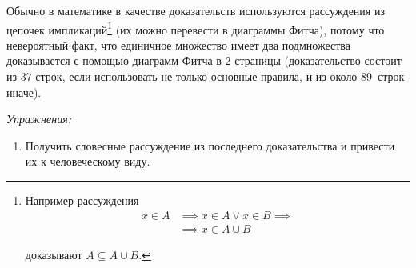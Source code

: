 Обычно в математике в качестве доказательств используются рассуждения
из цепочек импликаций\footnote{
	Например рассуждения
	\[
		\begin{aligned}
			x\in A
			 & \implies x\in A\lor x\in B\implies \\
			 & \implies x\in A\cup B
		\end{aligned}
	\]

	доказывают $A\subseteq A\cup B$.
} (их можно перевести в диаграммы Фитча),
потому что невероятный факт, что единичное множество имеет два подмножества доказывается
с помощью диаграмм Фитча в 2 страницы (доказательство состоит из 37 строк, если
использовать не только основные правила, и из около 89~строк иначе).

	{\it Упражнения:}
\begin{enumerate}
	\item{}Получить словесные рассуждение из последнего доказательства и привести их
	к человеческому виду.
\end{enumerate}
